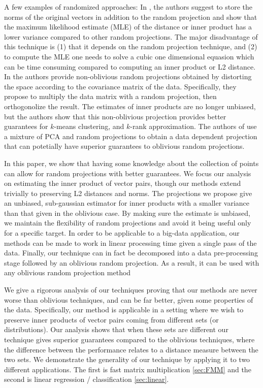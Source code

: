 \documentclass{article}
\theoremstyle{definition}
\theoremstyle{plain}
\begin{document}
A few examples of randomized approaches: In \cite{li2006improving}, the authors suggest to store the norms of the original vectors in addition to the random projection and show that the maximum likelihood estimate (MLE) of the distance or inner product has a lower variance compared to other random projections. The major disadvantage of this technique is (1) that it depends on the random projection technique, and (2) to compute the MLE one needs to solve a cubic one dimensional equasion which can be time consuming compared to computing an inner product or L2 distance. In \cite{cohen2015dimensionality} the authors provide non-oblivious random projections obtained by distorting the space according to the covariance matrix of the data. Specifically, they propose to multiply the data matrix with a random projection, then orthogonolize the result. The estimates of inner products are no longer unbiased, but the authors show that this non-oblivious projection provides better guarantees for $k$-means clustering, and $k$-rank approximation. The authors of \cite{sen2013informed} use a mixture of PCA and random projections to obtain a data dependent projection that can potetially have superior guarantees to oblivious random projections.


In this paper, we show that having some knowledge about the collection of points can allow for random projections with better guarantees. We focus our analysis on estimating the inner product of vector pairs, though our methods extend trivially to preserving L2 distances and norms. The projections we propose give an unbiased, sub-gaussian estimator for inner products with a smaller variance than that given in the oblivious case. By making sure the estimate is unbiased, we maintain the flexibility of random projections and avoid it being useful only for a specific target. In order to be applicable to a big-data application, our methods can be made to work in linear processing time given a single pass of the data. Finally, our technique can in fact be decomposed into a data pre-processing stage followed by an oblivious random projection. As a result, it can be used with any oblivious random projection method

We give a rigorous analysis of our techniques proving that our methods are never worse than oblivious techniques, and can be far better, given some properties of the data. Specifically, our method is applicable in a setting where we wish to preserve inner products of vector pairs coming from different sets (or distributions). Our analysis shows that when these sets are different our technique gives superior guarantees compared to the oblivious techniques, where the difference between the performance relates to a distance measure between the two sets. We demonstrate the generality of our technique by applying it to two different applications. The first is fast matrix multiplication \ref{sec:FMM} and the second is linear regression / classification \ref{sec:linear}.
\end{document}
